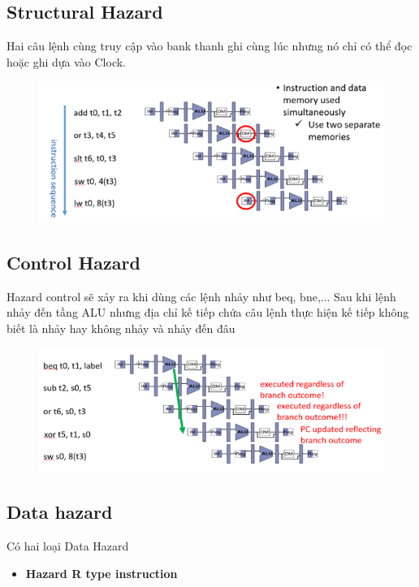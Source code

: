 \documentclass[E:/Latex/ExtraWork/ComputerArchitechture/Report.tex]{subfiles}
\begin{document}
\begin{otherlanguage}{english}
			\subsection{Structural Hazard}
			Hai câu lệnh cùng truy cập vào bank thanh ghi cùng lúc nhưng nó chỉ có thể đọc hoặc ghi dựa vào Clock.
					\begin{figure}[h!]
						\includegraphics[scale = 1]{Figure/Fig1.png}
						\centering
					\end{figure}
			\newpage		
			\subsection{Control Hazard }
			Hazard control sẽ xảy ra khi dùng các lệnh nhảy như beq, bne,... Sau khi lệnh nhảy đến tầng ALU nhưng địa chỉ kế tiếp chứa câu lệnh thực hiện kế tiếp không biết là nhảy hay không nhảy và nhảy đến đâu
					\begin{figure}[h!]
						\includegraphics[scale = 1]{Figure/Fig2.png}
						\centering
					\end{figure}
			\subsection{Data hazard }
			Có hai loại Data Hazard 
			\begin{itemize}
				\item \textbf {Hazard R type instruction}
					

\end{itemize}
\end{otherlanguage}
\end{document}

